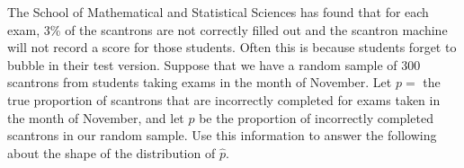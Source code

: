 \documentclass[noanswers]{exam}
\begin{document}
\begin{questions}
\begin{parts}
\begin{choices}
\end{choices}	

\vspace{3mm}
		
\end{parts}

\question The School of Mathematical and Statistical Sciences has found that for each exam, 3\% of the scantrons are not correctly filled out and the scantron machine will not record a score for those students. Often this is because students forget to bubble in their test version. Suppose that we have a random sample of 300 scantrons from students taking exams in the month of November. Let $p=$ the true proportion of scantrons that are incorrectly completed for exams taken in the month of November, and let $\hat{p}$ be the proportion of incorrectly completed scantrons in our random sample. Use this information to answer the following about the shape of the distribution of $\hat{p}$. 

\vspace{3mm}

\end{questions}
\end{document}
